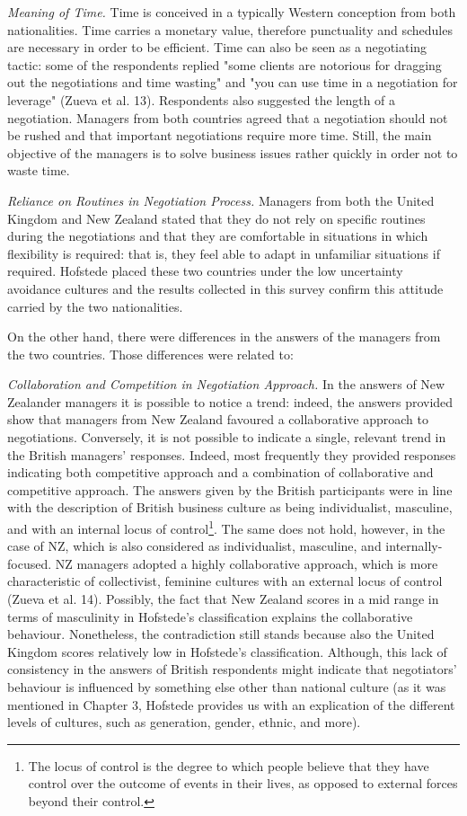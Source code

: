 \documentclass[../main.tex]{subfiles}
\begin{document}
\textit{Meaning of Time.} Time is conceived in a typically Western conception from both nationalities. Time carries a monetary value, therefore punctuality and schedules are necessary in order to be efficient. Time can also be seen as a negotiating tactic: some of the respondents replied "some clients are notorious for dragging out the negotiations and time wasting" and "you can use time in a negotiation for leverage" (Zueva et al. 13). Respondents also suggested the length of a negotiation. Managers from both countries agreed that a negotiation should not be rushed and that important negotiations require more time. Still, the main objective of the managers is to solve business issues rather quickly in order not to waste time. 

\textit{Reliance on Routines in Negotiation Process.} Managers from both the United Kingdom and New Zealand stated that they do not rely on specific routines during the negotiations and that they are comfortable in situations in which flexibility is required: that is, they feel able to adapt in unfamiliar situations if required. Hofstede placed these two countries under the low uncertainty avoidance cultures and the results collected in this survey confirm this attitude carried by the two nationalities.

On the other hand, there were differences in the answers of the managers from the two countries. Those differences were related to:

\textit{Collaboration and Competition in Negotiation Approach.} In the answers of New Zealander managers it is possible to notice a trend: indeed, the answers provided show that managers from New Zealand favoured a collaborative approach to negotiations. Conversely, it is not possible to indicate a single, relevant trend in the British managers' responses. Indeed, most frequently they provided responses indicating both competitive approach and a combination of collaborative and competitive approach. The answers given by the British participants were in line with the description of British business culture as being individualist, masculine, and with an internal locus of control\footnote{The locus of control is the degree to which people believe that they have control over the outcome of events in their lives, as opposed to external forces beyond their control.}. The same does not hold, however, in the case of NZ, which is also considered as individualist, masculine, and internally-focused. NZ managers adopted a highly collaborative approach, which is more characteristic of collectivist, feminine cultures with an external locus of control (Zueva et al. 14). Possibly, the fact that New Zealand scores in a mid range in terms of masculinity in Hofstede's classification explains the collaborative behaviour. Nonetheless, the contradiction still stands because also the United Kingdom scores relatively low in Hofstede's classification. Although, this lack of consistency in the answers of British respondents might indicate that negotiators' behaviour is influenced by something else other than national culture (as it was mentioned in Chapter 3, Hofstede provides us with an explication of the different levels of cultures, such as generation, gender, ethnic, and more).
\end{document}
